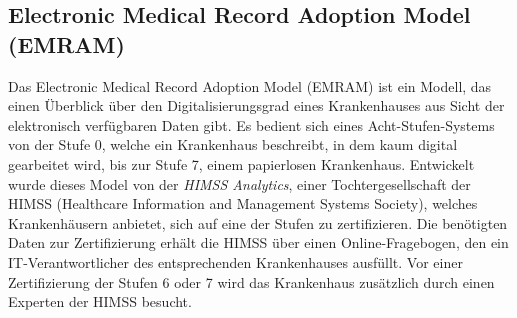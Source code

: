 \subsection{Electronic Medical Record Adoption Model (EMRAM)}
\label{sec:EMRAM}
	Das Electronic Medical Record Adoption Model (EMRAM) ist ein Modell, das einen Überblick über den Digitalisierungsgrad eines Krankenhauses aus Sicht der elektronisch verfügbaren Daten gibt. Es bedient sich eines Acht-Stufen-Systems von der Stufe 0, welche ein Krankenhaus beschreibt, in dem kaum digital gearbeitet wird, bis zur Stufe 7, einem papierlosen Krankenhaus. Entwickelt wurde dieses Model von der \textit{HIMSS Analytics}, einer Tochtergesellschaft der HIMSS (Healthcare Information and Management Systems Society), welches Krankenhäusern anbietet, sich auf eine der Stufen zu zertifizieren. Die benötigten Daten zur Zertifizierung erhält die HIMSS über einen Online-Fragebogen, den ein IT-Verantwortlicher des entsprechenden Krankenhauses ausfüllt. Vor einer Zertifizierung der Stufen 6 oder 7 wird das Krankenhaus zusätzlich durch einen Experten der HIMSS besucht. \parencite{Stephani2019}
